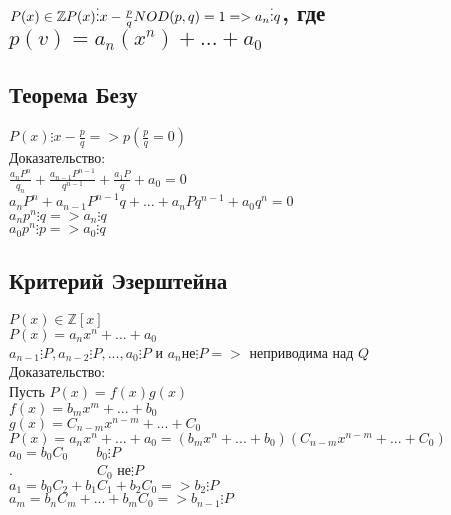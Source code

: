 \documentclass[12pt]{article}
\begin{document}
\subsection{$P(x) \in\mathbb{Z} P(x)\vdots x - \frac{p}{q}\\NOD(p,q)=1 => a_n \vdots q $, где $p(v)=a_n(x^n)+...+a_0$}
\subsection{Теорема Безу}
\noindent $P(x) \vdots x - \frac{p}{q} => p(\frac{p}{q} = 0)$
\\Доказательство: 
\\$\frac{a_nP^n}{q_n}+\frac{a_{n-1}P^{n-1}}{q^{n-1}}+\frac{a_1P}{q}+a_0=0$
\\$a_nP^n+a_{n-1}P^{n-1}q+...+a_nPq^{n-1}+a_0q^n=0$
\\$a_np^n \vdots q => a_n \vdots q$
\\$a_0p^n \vdots p => a_0 \vdots q$
\subsection{Критерий Эзерштейна}
\noindent $P(x) \in \mathbb{Z}[x]$
\\$P(x) = a_nx^n+...+a_0$
\\$a_{n-1}\vdots P, a_{n-2} \vdots P,...,a_0\vdots P$ и $a_n$не$\vdots P=>$ неприводима над $Q$ 
\\Доказательство: 
\\Пусть $P(x) = f(x)g(x)$
\\$f(x) = b_mx^m+...+b_0$
\\$g(x) = C_{n-m}x^{n-m}+...+C_0$
\\$P(x) = a_nx^n+...+a_0=(b_mx^n+...+b_0)(C_{n-m}x^{n-m}+...+C_0)$
\\$a_0=b_0C_0 \qquad b_0 \vdots P$
\\$. \hspace{6em}C_0$ не$ \vdots P$
\\$a_1=b_0C_2+b_1C_1+b_2C_0 => b_2\vdots P $
\\$a_m=b_nC_m+...+b_mC_0 => b_{n-1}\vdots P $
\end{document}
